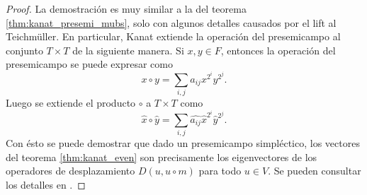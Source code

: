 \documentclass[a4paper,11pt]{report}
\DeclareMathOperator{\tr}{tr}
\DeclareMathOperator{\GF}{GF}
\begin{document}
  \begin{proof}
    La demostración es muy similar a la del teorema
    \ref{thm:kanat_presemi_mubs}, solo con algunos detalles
    causados por el lift al Teichmüller. En particular,
    Kanat extiende la operación del presemicampo al conjunto
    $T \times T$ de la siguiente manera. Si $x, y \in F$,
    entonces la operación del presemicampo se puede expresar
    como
    \[
      x \circ y
      = \sum_{i,j}^{} a_{ij} x^{2^{i}} y^{2^{j}}.
    \] 
    Luego se extiende el producto $\circ$ a $T \times T$
    como
    \[
      \hat x \circ \hat y
      = \sum_{i,j}^{} \widehat{a_{ij}} \hat{x}^{2^{i}}
      \hat{y}^{2^{j}}. 
    \] 
    Con ésto se puede demostrar que dado un presemicampo
    simpléctico, los vectores del teorema
    \ref{thm:kanat_even} son precisamente los eigenvectores
    de los operadores de desplazamiento $D(u,u\circ m)$ para
    todo $u \in V$.  Se pueden consultar los detalles en
    \cite{abdukhalikov2015}.
  \end{proof}
  
\end{document}
